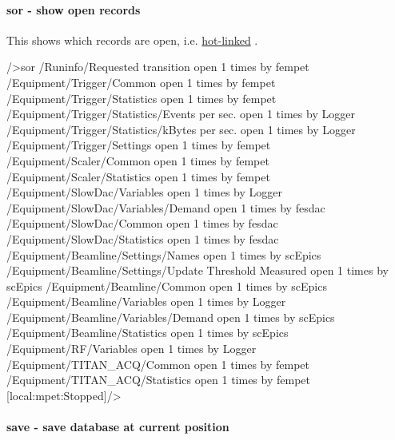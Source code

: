 \hypertarget{RC_odbedit_examples_RC_odbedit_sor}{}\paragraph{sor -\/ show open records}\label{RC_odbedit_examples_RC_odbedit_sor}
This shows which records are open, i.e. \hyperlink{RC_Hot_Link_RC_Hot_Link_Intro}{hot-\/linked} . 
\begin{DoxyCode}
/>sor
/Runinfo/Requested transition open 1 times by fempet
/Equipment/Trigger/Common open 1 times by fempet
/Equipment/Trigger/Statistics open 1 times by fempet
/Equipment/Trigger/Statistics/Events per sec. open 1 times by Logger
/Equipment/Trigger/Statistics/kBytes per sec. open 1 times by Logger
/Equipment/Trigger/Settings open 1 times by fempet
/Equipment/Scaler/Common open 1 times by fempet
/Equipment/Scaler/Statistics open 1 times by fempet
/Equipment/SlowDac/Variables open 1 times by Logger
/Equipment/SlowDac/Variables/Demand open 1 times by fesdac
/Equipment/SlowDac/Common open 1 times by fesdac
/Equipment/SlowDac/Statistics open 1 times by fesdac
/Equipment/Beamline/Settings/Names open 1 times by scEpics
/Equipment/Beamline/Settings/Update Threshold Measured open 1 times by scEpics
/Equipment/Beamline/Common open 1 times by scEpics
/Equipment/Beamline/Variables open 1 times by Logger
/Equipment/Beamline/Variables/Demand open 1 times by scEpics
/Equipment/Beamline/Statistics open 1 times by scEpics
/Equipment/RF/Variables open 1 times by Logger
/Equipment/TITAN_ACQ/Common open 1 times by fempet
/Equipment/TITAN_ACQ/Statistics open 1 times by fempet
[local:mpet:Stopped]/>    
\end{DoxyCode}




\hypertarget{RC_odbedit_examples_RC_odbedit_save}{}\paragraph{save -\/ save database at current position}\label{RC_odbedit_examples_RC_odbedit_save}

